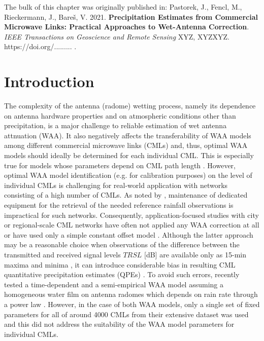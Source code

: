 \documentclass{ctuthesis}\usepackage[]{graphicx}\usepackage[]{color}
\begin{document}
{\footnotesize The bulk of this chapter was originally published in: \newline
\-\hspace{0.5cm}
Pastorek, J., Fencl, M., Rieckermann, J., Bareš, V. 2021. \textbf{Precipitation Estimates from Commercial Microwave Links: Practical Approaches to Wet-Antenna Correction}. \emph{IEEE Transactions on Geoscience and Remote Sensing} XYZ, XYZXYZ. \newline https://doi.org/......... .
}

\section{Introduction}

The complexity of the antenna (radome) wetting process, namely its dependence on antenna hardware properties \citep[e.g. coating;][]{lethMeasurementCampaignAssess2018} and on atmospheric conditions other than precipitation, is a major challenge to reliable estimation of wet antenna attnuation (WAA). It also negatively affects the transferability of WAA models among different commercial microwave links (CMLs) and, thus, optimal WAA models should ideally be determined for each individual CML. This is especially true for models whose parameters depend on CML path length \citep[e.g.][]{kharadlyEffectWetAntenna2001}. However, optimal WAA model identification (e.g. for calibration purposes) on the level of individual CMLs is challenging for real-world application with networks consisting of a high number of CMLs. As noted by \citep{ostrometzkyWetAntennaEffectFactor2018}, maintenance of dedicated equipment for the retrieval of the needed reference rainfall observations is impractical for such networks. Consequently, application-focused studies with city or regional-scale CML networks have often not applied any WAA correction at all \citep{chwalaPrecipitationObservationUsing2012, smiatekPotentialCommercialMicrowave2017} or have used only a simple constant offset model \citep{pastorekCommercialMicrowaveLinks2019, overeemMeasuringUrbanRainfall2011, roversiCommercialMicrowaveLinks2020, fenclAtmosphericObservationsEband2020}. Although the latter approach may be a reasonable choice when observations of the difference between the transmitted and received signal levels $TRSL$ [dB] are available only as 15-min maxima and minima  \citep{chwalaCommercialMicrowaveLink2019}, it can introduce considerable bias in resulting CML quantitative precipitation estimates (QPEs) \citep{pastorekCommercialMicrowaveLinks2019, fenclQuantifyingWetAntenna2019}. To avoid such errors, \cite{grafRainfallEstimationGermanwide2020} recently tested a time-dependent \citep{schleissQuantificationModelingWetAntenna2013} and a semi-empirical WAA model assuming a homogeneous water film on antenna radomes which depends on rain rate through a power law \citep{leijnseMicrowaveLinkRainfall2008}. However, in the case of both WAA models, only a single set of fixed parameters for all of around 4000 CMLs from their extensive dataset was used and this did not address the suitability of the WAA model parameters for individual CMLs.
\end{document}
